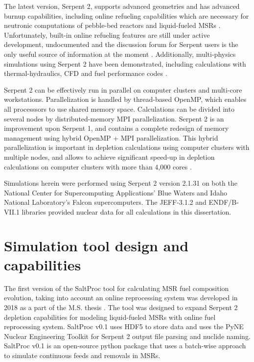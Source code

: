 The latest version, Serpent 2, supports advanced geometries and has advanced 
burnup capabilities, including online refueling capabilities which are 
necessary for neutronic computations of pebble-bed reactors and liquid-fueled 
\glspl{MSR} \cite{aufiero_extended_2013}. Unfortunately, built-in online 
refueling features are still under active development, undocumented and the 
discussion forum for Serpent users is the only useful source of information at 
the moment \cite{aufiero_extended_2013}. Additionally, multi-physics 
simulations using Serpent 2 have been demonstrated, including  calculations 
with thermal-hydraulics, \gls{CFD} and fuel performance codes 
\cite{leppanen_numerical_2015}. 

Serpent 2 can be effectively run in parallel on computer clusters and 
multi-core workstations. Parallelization is handled by thread-based OpenMP, 
which enables all processsors to use shared memory space. Calculations can be 
divided into several nodes by distributed-memory \gls{MPI} parallelization. 
Serpent 2  is an improvement upon Serpent 1, and contains a complete redesign 
of memory management using hybrid OpenMP \cite{dagum_openmp_1998} + \gls{MPI} 
parallelization.  This hybrid parallelization is important in depletion 
calculations using computer clusters with multiple nodes, and allows to 
achieve significant speed-up in depletion calculations on computer clusters 
with more than 4,000 cores \cite{leppanen_serpent_2014}. 

Simulations herein were performed using Serpent 2 version 2.1.31 on both the 
National Center for Supercomputing Applications' Blue Waters and Idaho 
National Laboratory's Falcon supercomputers. The JEFF-3.1.2 
\cite{oecd/nea_jeff-3.1.2_2014} and ENDF/B-VII.1 
\cite{chadwick_endf/b-vii.1_2011} libraries provided nuclear data 
for all calculations in this dissertation. 

\section{Simulation tool design and capabilities}\label{sec:tool_design}
The first version of the SaltProc tool for calculating \gls{MSR} fuel 
composition evolution, taking into account an online reprocessing system 
was developed in 2018 as a part of the M.S. thesis  
\cite{rykhlevskii_arfc/saltproc_2018, rykhlevskii_advanced_2018}. The tool was 
designed to expand Serpent 2 depletion capabilities for modeling liquid-fueled 
\glspl{MSR} with online fuel reprocessing system. SaltProc v0.1 uses 
HDF5 
\cite{the_hdf_group_hierarchical_1997} to store data and uses the PyNE Nuclear 
Engineering Toolkit \cite{scopatz_pyne_2012} for Serpent 2 output file parsing 
and nuclide naming. SaltProc v0.1 is an open-source python package that uses a 
batch-wise approach to simulate continuous feeds and removals in \glspl{MSR}. 

